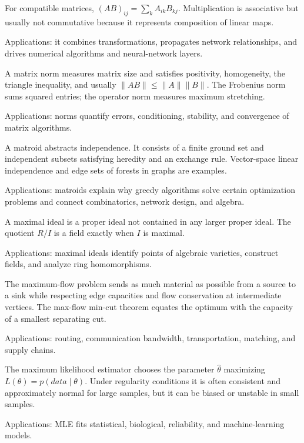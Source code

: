 For compatible matrices, $(AB)_{ij}=\sum_kA_{ik}B_{kj}$. Multiplication is associative but usually not commutative because it represents composition of linear maps. \par\noindent Applications: it combines transformations, propagates network relationships, and drives numerical algorithms and neural-network layers.

A matrix norm measures matrix size and satisfies positivity, homogeneity, the triangle inequality, and usually $\|AB\|\leq\|A\|\|B\|$. The Frobenius norm sums squared entries; the operator norm measures maximum stretching. \par\noindent Applications: norms quantify errors, conditioning, stability, and convergence of matrix algorithms.

A matroid abstracts independence. It consists of a finite ground set and independent subsets satisfying heredity and an exchange rule. Vector-space linear independence and edge sets of forests in graphs are examples. \par\noindent Applications: matroids explain why greedy algorithms solve certain optimization problems and connect combinatorics, network design, and algebra.

A maximal ideal is a proper ideal not contained in any larger proper ideal. The quotient $R/I$ is a field exactly when $I$ is maximal. \par\noindent Applications: maximal ideals identify points of algebraic varieties, construct fields, and analyze ring homomorphisms.

The maximum-flow problem sends as much material as possible from a source to a sink while respecting edge capacities and flow conservation at intermediate vertices. The max-flow min-cut theorem equates the optimum with the capacity of a smallest separating cut. \par\noindent Applications: routing, communication bandwidth, transportation, matching, and supply chains.

The maximum likelihood estimator chooses the parameter $\hat\theta$ maximizing $L(\theta)=p(data\mid\theta)$. Under regularity conditions it is often consistent and approximately normal for large samples, but it can be biased or unstable in small samples. \par\noindent Applications: MLE fits statistical, biological, reliability, and machine-learning models.

